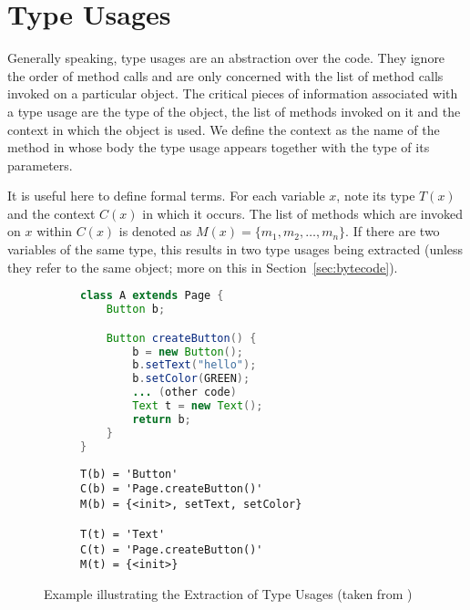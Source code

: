 \section{Type Usages}

Generally speaking, type usages are an abstraction over the code.
They ignore the order of method calls and are only concerned with the list of method calls invoked on a particular object.
The critical pieces of information associated with a type usage are the type of the object, the list of methods invoked on it and the context in which the object is used.
We define the context as the name of the method in whose body the type usage appears together with the type of its parameters.

It is useful here to define formal terms.
For each variable $x$, note its type $T(x)$ and the context $C(x)$ in which it occurs.
The list of methods which are invoked on $x$ within $C(x)$ is denoted as $M(x) =\{ m_1, m_2, \dotsc, m_n\}$.
If there are two variables of the same type, this results in two type usages being extracted (unless they refer to the same object; more on this in Section~\ref{sec:bytecode}).

\begin{figure}[h]
    \begin{subfigure}[c]{0.5\textwidth}
        \begin{lstlisting}[language=java, basicstyle=\small]
class A extends Page {
    Button b;

    Button createButton() {
        b = new Button();
        b.setText("hello");
        b.setColor(GREEN);
        ... (other code)
        Text t = new Text();
        return b;
    }
}
        \end{lstlisting}
    \end{subfigure}
    \begin{subfigure}[c]{0.5\textwidth}
        \begin{lstlisting}[basicstyle=\small]
T(b) = 'Button'
C(b) = 'Page.createButton()'
M(b) = {<init>, setText, setColor}

T(t) = 'Text'
C(t) = 'Page.createButton()'
M(t) = {<init>}
        \end{lstlisting}
    \end{subfigure}
    \caption{Example illustrating the Extraction of Type Usages (taken from \cite{monperrus2013detecting})}
    \label{fig:tu_example}
\end{figure}

